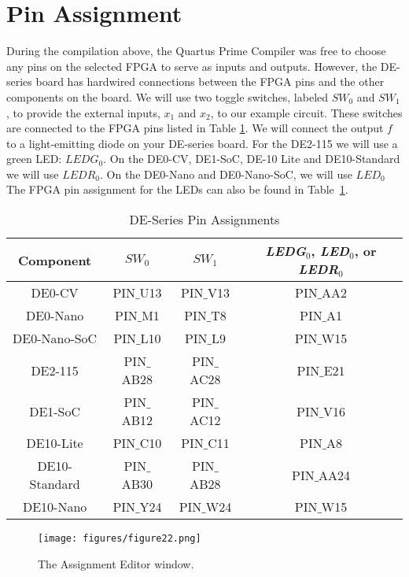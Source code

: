 \section{Pin Assignment}


During the compilation above, the Quartus Prime Compiler was free to choose any
pins on the selected FPGA to serve as inputs and outputs. However, the DE-series board
has hardwired connections between the FPGA pins and the other components on the board.
We will use two toggle switches, labeled $SW_0$ and $SW_1$, to provide the
external inputs, $x_1$ and $x_2$, to our example circuit. These switches are connected
to the FPGA pins listed in Table \ref{tab:pinassign}. We will connect the output $f$ to a
light-emitting diode on your DE-series board. For the DE2-115 we will use a green LED: $LEDG_0$.
On the DE0-CV, DE1-SoC, DE-10 Lite and DE10-Standard we will use $LEDR_0$. On the DE0-Nano and DE0-Nano-SoC, we will use $LED_0$
The FPGA pin assignment for the LEDs can also be found in Table~\ref{tab:pinassign}.

\begin{table}[H]
\centering
\begin{tabular}{| c | c | c | c |}
\hline
Component & $SW_0$ & $SW_1$ & {\it LEDG}$_0$, {\it LED}$_0$, or {\it LEDR}$_0$ \\
\hline
DE0-CV & PIN$\_$U13 & PIN$\_$V13 & PIN$\_$AA2 \\
\hline
DE0-Nano & PIN$\_$M1 & PIN$\_$T8 & PIN$\_$A1 \\
\hline
DE0-Nano-SoC & PIN$\_$L10 & PIN$\_$L9 & PIN$\_$W15 \\
\hline
DE2-115 & PIN$\_$AB28 & PIN$\_$AC28 & PIN$\_$E21 \\
\hline
DE1-SoC & PIN$\_$AB12 & PIN$\_$AC12 & PIN$\_$V16 \\
\hline
DE10-Lite & PIN$\_$C10 & PIN$\_$C11 & PIN$\_$A8 \\
\hline
DE10-Standard & PIN$\_$AB30 & PIN$\_$AB28 & PIN$\_$AA24 \\
\hline
DE10-Nano & PIN$\_$Y24 & PIN$\_$W24 & PIN$\_$W15 \\
\hline
\end{tabular}
 
\caption{DE-Series Pin Assignments}
\label{tab:pinassign}
\end{table}

\begin{figure}[H]
   \begin{center}
      \texttt{[image: figures/figure22.png]}
   \caption{The Assignment Editor window.} 
	 \label{fig:22}
	 \end{center}
\end{figure}

